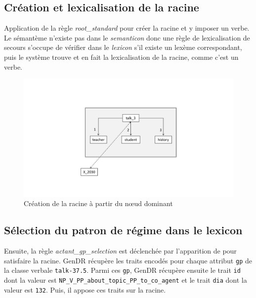 \subsection{Création et lexicalisation de la racine}
Application de la règle \emph{root\_standard} pour créer la racine et y imposer un verbe. Le sémantème  n'existe pas dans le \emph{semanticon} donc une règle de lexicalisation de secours s'occupe de vérifier dans le \emph{lexicon} s'il existe un lexème correspondant, puis le système trouve  et en fait la lexicalisation de la racine, comme c'est un verbe.

\begin{figure}[htb]
	\centering
	\includegraphics[width=1\textwidth, trim = {0cm 3.4cm 0cm 4.7cm},clip]{ch6/figs/root_implem.pdf}
	\caption{Création de la racine à partir du n\oe{}ud dominant}
	\label{deroulement0}
\end{figure}

\subsection{Sélection du patron de régime dans le lexicon}
Ensuite, la règle \emph{actant\_gp\_selection} est déclenchée par l'apparition de  pour satisfaire la racine. GenDR récupère les traits encodés pour chaque attribut \texttt{gp} de la classe verbale \texttt{talk-37.5}. Parmi ces \texttt{gp}, GenDR récupère ensuite le trait \texttt{id} dont la valeur est \texttt{NP\_V\_PP\_about\_topic\_PP\_to\_co\_agent} et le trait \texttt{dia} dont la valeur est \texttt{132}. Puis, il appose ces traits sur la racine.

